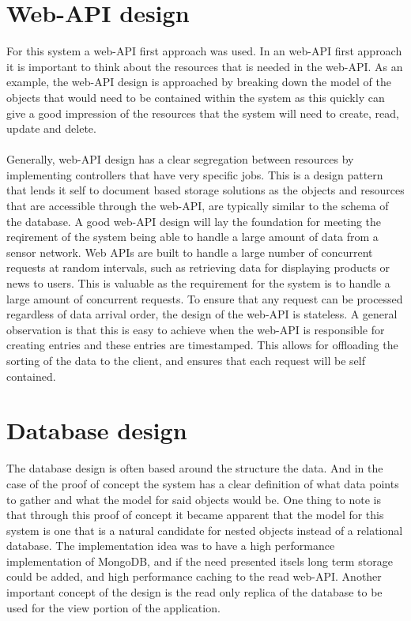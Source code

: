 \documentclass[]{uiophd}
\begin{document}
\section{Web-API design}
For this system a web-API first approach was used. In an web-API first approach it is important to think about the resources that is needed in the web-API. As an example, the web-API design is approached by breaking down the model of the objects that would need to be contained within the system as this quickly can give a good impression of the resources that the system will need to create, read, update and delete. 
\\\\
Generally, web-API design has a clear segregation between resources by implementing controllers that have very specific jobs. This is a design pattern that lends it self to document based storage solutions as the objects and resources that are accessible through the web-API, are typically similar to the schema of the database. A good web-API design will lay  the foundation for meeting the reqirement of the system being able to handle a large amount of data from a sensor network. Web APIs are built to handle a large number of concurrent requests at random intervals, such as retrieving data for displaying products or news to users. This is valuable as the requirement for the system is to handle a large amount of concurrent requests. To ensure that any request can be processed regardless of data arrival order, the design of the web-API is stateless. A general observation is that this is easy to achieve when the web-API is responsible for creating entries and these entries are timestamped. This allows for offloading the sorting of the data to the client, and ensures that each request will be self contained.

\section{Database design}
The database design is often based around the structure the data. And in the case of the proof of concept the system has a clear definition of what data points to gather and what the model for said objects would be. One thing to note is that through this proof of concept it became apparent that the model for this system is one that is a natural candidate for nested objects instead of a relational database. The implementation idea was to have a high performance implementation of MongoDB, and if the need presented itsels long term storage could be added, and high performance caching to the read web-API. Another important concept of the design is the read only replica of the database to be used for the view portion of the application.
\end{document}
